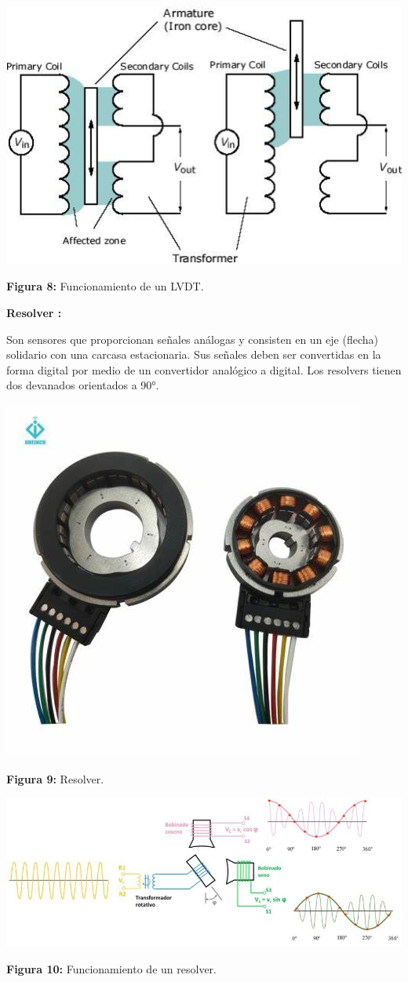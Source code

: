 \begin{center}
	\includegraphics[width=0.5\linewidth]{img/Slvdt}
	
	\vspace{2mm} %
	
	\textbf{Figura 8:} Funcionamiento de un LVDT.
\end{center}


\vspace{10mm}

\textbf{Resolver :} 

Son sensores que proporcionan señales análogas y consisten en un eje (flecha) solidario con una carcasa estacionaria. Sus señales deben ser convertidas en la forma digital por medio de un convertidor analógico a digital. Los resolvers tienen dos devanados orientados a 90°.

\vspace{5mm}

\begin{center}
	\includegraphics[width=0.2\linewidth, height=0.15\textheight]{img/resolver}
	
	\vspace{2mm} %
	
	\textbf{Figura 9:} Resolver.
\end{center}

\vspace{5mm} %

\begin{center}
	\includegraphics[width=0.4\linewidth]{img/Srevolver}
	
	\vspace{2mm} %
	
	\textbf{Figura 10:} Funcionamiento de un resolver.
\end{center}

